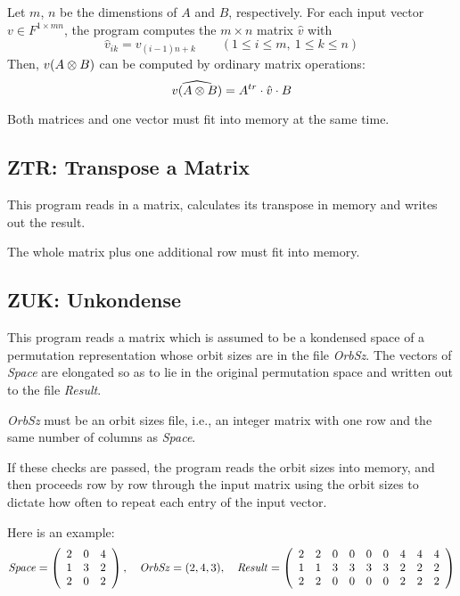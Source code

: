 \Implementation
Let $m$, $n$ be the dimenstions of $A$ and $B$, respectively. For each
input vector $v\in F^{1\times mn}$, the program computes the $m\times n$
matrix $\hat{v}$ with
\[
	\hat{v}_{ik} = v_{(i-1)n + k}\qquad
	(1\leq i\leq m,\ 1\leq k\leq n)
\]
Then, $v(A\otimes B)$ can be computed by ordinary matrix operations:
\[
    \widehat{v(A\otimes B)} = A^{tr}\cdot\hat{v}\cdot B
\]

\Limits
Both matrices and one vector must fit into memory at the same time.




\subsection{ZTR: Transpose a Matrix}
\Syntax
{}

\Description
This program reads in a matrix, calculates its transpose in memory
and writes out the result.

\Limits
The whole matrix plus one additional row must fit into memory.


\subsection{ZUK: Unkondense}
\Syntax
{}
 
\Description
This program reads a matrix which is assumed to be a kondensed
space of a permutation representation whose orbit sizes are in the
file {\it OrbSz}. The vectors of {\it Space} are elongated so as to
lie in the original permutation space and written out to the file
{\it Result}.
 
{\it OrbSz} must be an orbit sizes file, i.e., an integer matrix
with one row and the same number of columns as {\it Space}.

If these checks are passed, the program reads the orbit sizes into
memory, and then proceeds row by row through the input matrix using
the orbit sizes to dictate how often to repeat each entry of the
input vector.

Here is an example:
\[
	{\it Space}= \left(\begin{array}{ccc}
		2 & 0 & 4 \\
		1 & 3 & 2 \\
		2 & 0 & 2 \\
	\end{array}\right),\quad
	{\it OrbSz} = ( 2,4,3 ),\quad
	{\it Result}= \left(\begin{array}{ccccccccc}
		2 & 2 & 0 & 0 & 0 & 0 & 4 & 4 & 4\\
		1 & 1 & 3 & 3 & 3 & 3 & 2 & 2 & 2\\
		2 & 2 & 0 & 0 & 0 & 0 & 2 & 2 & 2\\
	\end{array}\right)
\]



